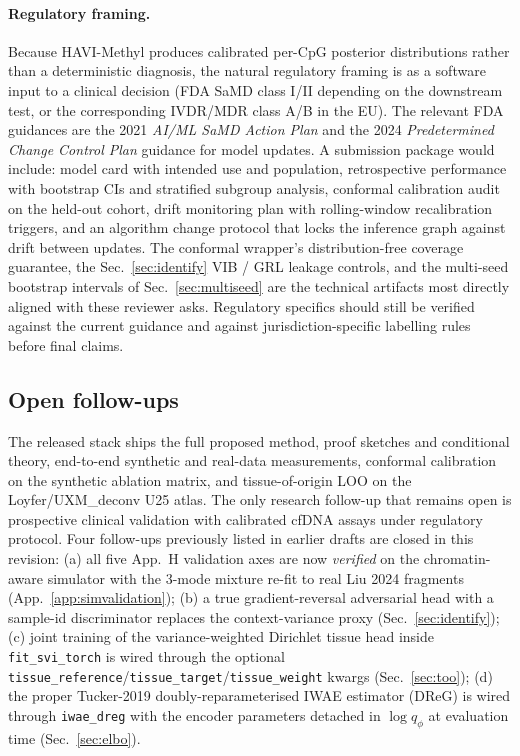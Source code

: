 \paragraph{Regulatory framing.} Because HAVI-Methyl produces calibrated per-CpG posterior distributions rather than a deterministic diagnosis, the natural regulatory framing is as a software input to a clinical decision (FDA SaMD class I/II depending on the downstream test, or the corresponding IVDR/MDR class A/B in the EU). The relevant FDA guidances are the 2021 \emph{AI/ML SaMD Action Plan} and the 2024 \emph{Predetermined Change Control Plan} guidance for model updates. A submission package would include: model card with intended use and population, retrospective performance with bootstrap CIs and stratified subgroup analysis, conformal calibration audit on the held-out cohort, drift monitoring plan with rolling-window recalibration triggers, and an algorithm change protocol that locks the inference graph against drift between updates. The conformal wrapper's distribution-free coverage guarantee, the Sec.~\ref{sec:identify} VIB / GRL leakage controls, and the multi-seed bootstrap intervals of Sec.~\ref{sec:multiseed} are the technical artifacts most directly aligned with these reviewer asks. Regulatory specifics should still be verified against the current guidance and against jurisdiction-specific labelling rules before final claims.

\subsection{Open follow-ups}
The released stack ships the full proposed method, proof sketches and conditional theory, end-to-end synthetic and real-data measurements, conformal calibration on the synthetic ablation matrix, and tissue-of-origin LOO on the Loyfer/UXM\_deconv U25 atlas. The only research follow-up that remains open is prospective clinical validation with calibrated cfDNA assays under regulatory protocol. Four follow-ups previously listed in earlier drafts are closed in this revision: (a) all five App.~H validation axes are now \emph{verified} on the chromatin-aware simulator with the 3-mode mixture re-fit to real Liu 2024 fragments (App.~\ref{app:simvalidation}); (b) a true gradient-reversal adversarial head with a sample-id discriminator replaces the context-variance proxy (Sec.~\ref{sec:identify}); (c) joint training of the variance-weighted Dirichlet tissue head inside \texttt{fit\_svi\_torch} is wired through the optional \texttt{tissue\_reference}/\texttt{tissue\_target}/\texttt{tissue\_weight} kwargs (Sec.~\ref{sec:too}); (d) the proper Tucker-2019 doubly-reparameterised IWAE estimator (DReG) is wired through \texttt{iwae\_dreg} with the encoder parameters detached in $\log q_\phi$ at evaluation time (Sec.~\ref{sec:elbo}).

